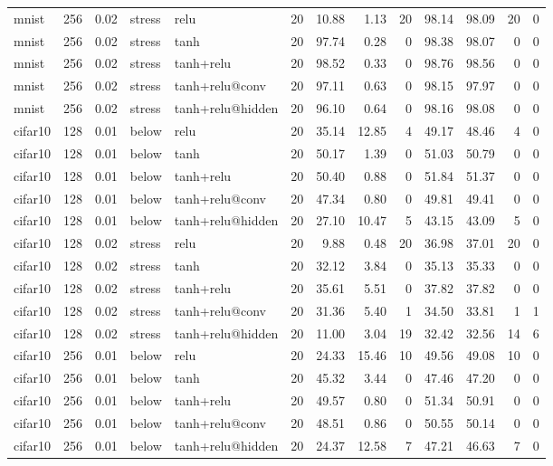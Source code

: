 \begin{table}[htbp]
{\begin{tabular}{@{}lrrllrrrrrrrr@{}}
mnist & 256 & 0.02 & stress & relu & 20 & 10.88 & 1.13 & 20 & 98.14 & 98.09 & 20 & 0 \\
mnist & 256 & 0.02 & stress & tanh & 20 & 97.74 & 0.28 & 0 & 98.38 & 98.07 & 0 & 0 \\
mnist & 256 & 0.02 & stress & tanh+relu & 20 & 98.52 & 0.33 & 0 & 98.76 & 98.56 & 0 & 0 \\
mnist & 256 & 0.02 & stress & tanh+relu@conv & 20 & 97.11 & 0.63 & 0 & 98.15 & 97.97 & 0 & 0 \\
mnist & 256 & 0.02 & stress & tanh+relu@hidden & 20 & 96.10 & 0.64 & 0 & 98.16 & 98.08 & 0 & 0 \\
cifar10 & 128 & 0.01 & below & relu & 20 & 35.14 & 12.85 & 4 & 49.17 & 48.46 & 4 & 0 \\
cifar10 & 128 & 0.01 & below & tanh & 20 & 50.17 & 1.39 & 0 & 51.03 & 50.79 & 0 & 0 \\
cifar10 & 128 & 0.01 & below & tanh+relu & 20 & 50.40 & 0.88 & 0 & 51.84 & 51.37 & 0 & 0 \\
cifar10 & 128 & 0.01 & below & tanh+relu@conv & 20 & 47.34 & 0.80 & 0 & 49.81 & 49.41 & 0 & 0 \\
cifar10 & 128 & 0.01 & below & tanh+relu@hidden & 20 & 27.10 & 10.47 & 5 & 43.15 & 43.09 & 5 & 0 \\
cifar10 & 128 & 0.02 & stress & relu & 20 & 9.88 & 0.48 & 20 & 36.98 & 37.01 & 20 & 0 \\
cifar10 & 128 & 0.02 & stress & tanh & 20 & 32.12 & 3.84 & 0 & 35.13 & 35.33 & 0 & 0 \\
cifar10 & 128 & 0.02 & stress & tanh+relu & 20 & 35.61 & 5.51 & 0 & 37.82 & 37.82 & 0 & 0 \\
cifar10 & 128 & 0.02 & stress & tanh+relu@conv & 20 & 31.36 & 5.40 & 1 & 34.50 & 33.81 & 1 & 1 \\
cifar10 & 128 & 0.02 & stress & tanh+relu@hidden & 20 & 11.00 & 3.04 & 19 & 32.42 & 32.56 & 14 & 6 \\
cifar10 & 256 & 0.01 & below & relu & 20 & 24.33 & 15.46 & 10 & 49.56 & 49.08 & 10 & 0 \\
cifar10 & 256 & 0.01 & below & tanh & 20 & 45.32 & 3.44 & 0 & 47.46 & 47.20 & 0 & 0 \\
cifar10 & 256 & 0.01 & below & tanh+relu & 20 & 49.57 & 0.80 & 0 & 51.34 & 50.91 & 0 & 0 \\
cifar10 & 256 & 0.01 & below & tanh+relu@conv & 20 & 48.51 & 0.86 & 0 & 50.55 & 50.14 & 0 & 0 \\
cifar10 & 256 & 0.01 & below & tanh+relu@hidden & 20 & 24.37 & 12.58 & 7 & 47.21 & 46.63 & 7 & 0 \\

\end{tabular}}
\end{table}
